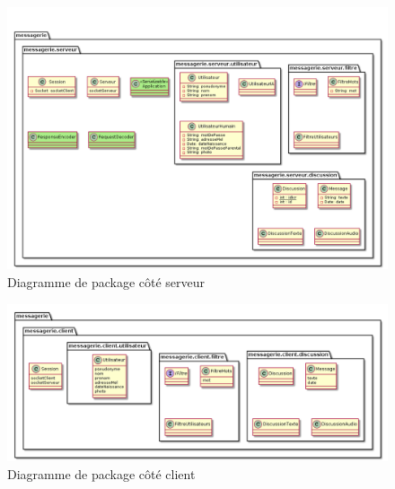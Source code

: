 	\begin{figure}[H]
	\centerline{\includegraphics[width=16.5cm]{img/packageServeurV2.png}}
		\caption{Diagramme de package côté serveur}
	\end{figure}

	\begin{figure}[H]
	\centerline{\includegraphics[width=16.5cm]{img/packageClient.png}}
	\caption{Diagramme de package côté client}
	\end{figure}
